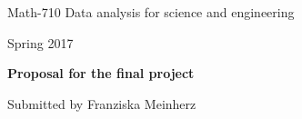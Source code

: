 \documentclass[11pt, UKenglish]{report}
\begin{document}

\noindent \large Math-710 Data analysis for science and engineering

\noindent Spring 2017

\vspace{0.5cm}
\noindent \LARGE \textbf{Proposal for the final project}

\normalsize
\vspace{1cm}
\noindent Submitted by \large{Franziska Meinherz} 

\vspace{0.5cm}



\end{document}
